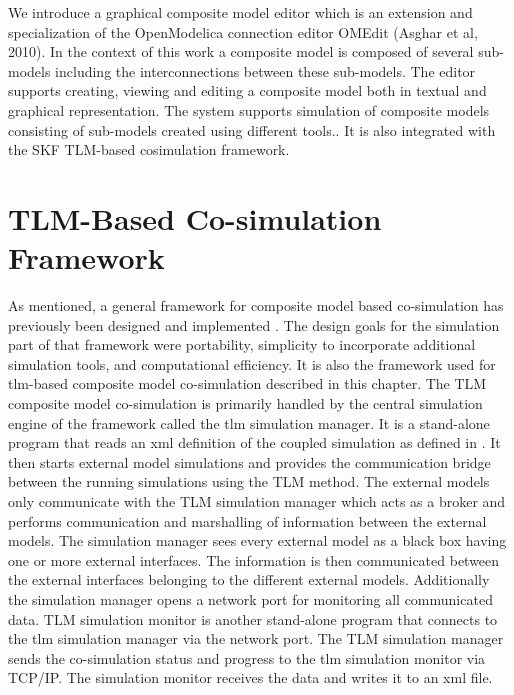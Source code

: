 We introduce a graphical composite model editor which is an extension and specialization of the
OpenModelica connection editor OMEdit (Asghar et al, 2010). In the context of this work a composite
model is composed of several sub-models including the interconnections between these sub-models. 
The editor supports creating, viewing and editing a composite model both in textual and graphical representation. 
The system supports simulation of composite models consisting of sub-models created using different tools.. It is also integrated
with the SKF TLM-based cosimulation framework.

\section{TLM-Based Co-simulation Framework}
\label{sec:tlmframework}

As men\-tioned, a gen\-eral frame\-work for com\-pos\-ite model based co-simulation has pre\-vi\-ously 
been de\-signed and im\-ple\-mented  \cite{tlmalexander05}. The design goals for the simulation part of that framework
were portability, simplicity to incorporate additional simulation tools, and computational efficiency. 
It is also the framework used for \acrshort{tlm}-based composite model co-simulation described in this chapter.
The TLM composite model co-simulation is primarily handled by the central simulation engine of the framework 
called the \acrshort{tlm} simulation manager. It is a stand-alone program that reads an \acrshort{xml} definition
of the coupled simulation as defined in \cite{tlmalexander05}. It then starts external model simulations and
provides the communication bridge between the running simulations using the TLM \cite{tlmlakov06} method. 
The external models only communicate with the TLM simulation manager which acts as a broker and
performs communication and marshalling of information between the external models. The
simulation manager sees every external model as a black box having one or more external interfaces. The
information is then communicated between the external interfaces belonging to the different external models.
Additionally the simulation manager opens a network port for monitoring all communicated data.
TLM simulation monitor is another stand-alone program that connects to the \acrshort{tlm} simulation manager via the network port. 
The TLM simulation manager sends the co-simulation status and progress to the \acrshort{tlm}
simulation monitor via TCP/IP. The simulation monitor receives the data and writes it to an \acrshort{xml} file.

